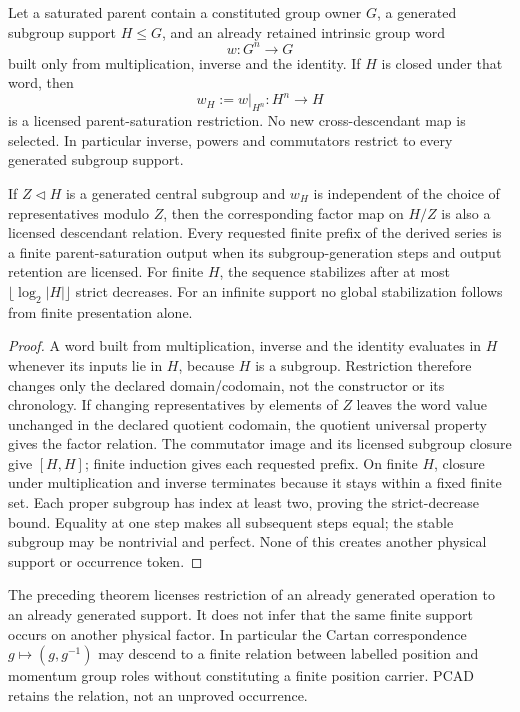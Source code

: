 \documentclass[12pt,a4paper]{article}
\begin{document}
\begin{theorem}
\label{p2a:thm:v188-group-word-restriction}
Let a saturated parent contain a constituted group owner $G$, a generated
subgroup support $H\le G$, and an already retained intrinsic group word
\[
 w:G^n\to G
\]
built only from multiplication, inverse and the identity.  If $H$ is closed
under that word, then
\[
 \boxed{w_H:=w|_{H^n}:H^n\to H}
\]
is a licensed parent-saturation restriction.  No new cross-descendant map is
selected.  In particular inverse, powers and commutators restrict to every
generated subgroup support.

If $Z\triangleleft H$ is a generated central subgroup and $w_H$ is independent
of the choice of representatives modulo $Z$, then the corresponding factor
map on $H/Z$ is also a licensed descendant relation. Every requested
finite prefix of the derived series is a finite parent-saturation output
when its subgroup-generation steps and output retention are licensed. For
finite $H$, the sequence stabilizes after at most
$\lfloor\log_2|H|\rfloor$ strict decreases. For an infinite support no global
stabilization follows from finite presentation alone.
\end{theorem}

\begin{proof}
A word built from multiplication, inverse and the identity evaluates in $H$
whenever its inputs lie in $H$, because $H$ is a subgroup.  Restriction
therefore changes only the declared domain/codomain, not the constructor or
its chronology.  If changing representatives by elements of $Z$ leaves the
word value unchanged in the declared quotient codomain, the quotient
universal property gives the factor relation. The commutator image and its
licensed subgroup closure give $[H,H]$; finite induction gives each requested
prefix. On finite $H$, closure under multiplication and inverse terminates
because it stays within a fixed finite set. Each proper subgroup has index
at least two, proving the strict-decrease bound. Equality at one step makes
all subsequent steps equal; the stable subgroup may be nontrivial and
perfect. None of this creates another physical support or occurrence token.
\end{proof}

\begin{remark}
\label{p2a:rem:v188-finite-support-occurrence-firewall}
The preceding theorem licenses restriction of an already generated operation
to an already generated support.  It does not infer that the same finite
support occurs on another physical factor.  In particular the Cartan
correspondence $g\mapsto(g,g^{-1})$ may descend to a finite relation between
labelled position and momentum group roles without constituting a finite
position carrier.  PCAD retains the relation, not an unproved occurrence.
\end{remark}
\end{document}
